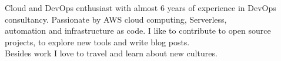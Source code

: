 

\begin{cvparagraph}

Cloud and DevOps enthusiast with almost 6 years of experience in DevOps consultancy.
Passionate by AWS cloud computing, Serverless,\\automation and infrastructure as code. 
I like to contribute to open source projects, to explore new tools and write blog posts.\\
Besides work I love to travel and learn about new cultures. 
\end{cvparagraph}
